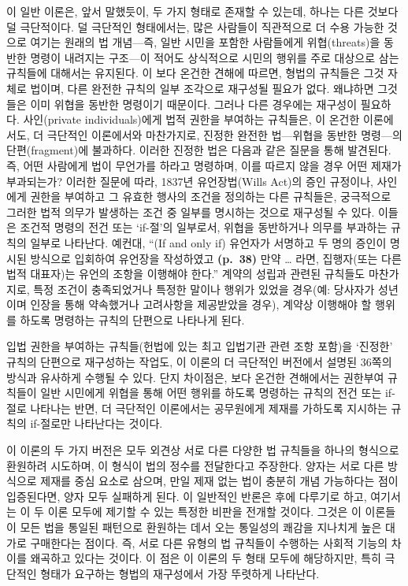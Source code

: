 \documentclass[12pt, oneside]{book}  %
\begin{document}
이 일반 이론은, 앞서 말했듯이, 두 가지 형태로 존재할 수 있는데, 하나는
다른 것보다 덜 극단적이다. 덜 극단적인 형태에서는, 많은 사람들이
직관적으로 더 수용 가능한 것으로 여기는 원래의 법 개념---즉, 일반 시민을
포함한 사람들에게 위협(threats)을 동반한 명령이 내려지는 구조---이
적어도 상식적으로 시민의 행위를 주로 대상으로 삼는 규칙들에 대해서는
유지된다. 이 보다 온건한 견해에 따르면, 형법의 규칙들은 그것 자체로
법이며, 다른 완전한 규칙의 일부 조각으로 재구성될 필요가 없다. 왜냐하면
그것들은 이미 위협을 동반한 명령이기 때문이다. 그러나 다른 경우에는
재구성이 필요하다. 사인(private individuals)에게 법적 권한을 부여하는
규칙들은, 이 온건한 이론에서도, 더 극단적인 이론에서와 마찬가지로,
진정한 완전한 법---위협을 동반한 명령---의 단편(fragment)에 불과하다.
이러한 진정한 법은 다음과 같은 질문을 통해 발견된다. 즉, 어떤 사람에게
법이 무언가를 하라고 명령하며, 이를 따르지 않을 경우 어떤 제재가
부과되는가? 이러한 질문에 따라, 1837년 유언장법(Wills Act)의 증인
규정이나, 사인에게 권한을 부여하고 그 유효한 행사의 조건을 정의하는 다른
규칙들은, 궁극적으로 그러한 법적 의무가 발생하는 조건 중 일부를 명시하는
것으로 재구성될 수 있다. 이들은 조건적 명령의 전건 또는 `if-절'의
일부로서, 위협을 동반하거나 의무를 부과하는 규칙의 일부로 나타난다.
예컨대, ``(If and only if) 유언자가 서명하고 두 명의 증인이 명시된
방식으로 입회하여 유언장을 작성하였고 \textbf{(p.~38)} 만약 \ldots{}
라면, 집행자(또는 다른 법적 대표자)는 유언의 조항을 이행해야 한다.''
계약의 성립과 관련된 규칙들도 마찬가지로, 특정 조건이 충족되었거나
특정한 말이나 행위가 있었을 경우(예: 당사자가 성년이며 인장을 통해
약속했거나 고려사항을 제공받았을 경우), 계약상 이행해야 할 행위를 하도록
명령하는 규칙의 단편으로 나타나게 된다.

입법 권한을 부여하는 규칙들(헌법에 있는 최고 입법기관 관련 조항 포함)을
`진정한' 규칙의 단편으로 재구성하는 작업도, 이 이론의 더 극단적인
버전에서 설명된 36쪽의 방식과 유사하게 수행될 수 있다. 단지 차이점은,
보다 온건한 견해에서는 권한부여 규칙들이 일반 시민에게 위협을 통해 어떤
행위를 하도록 명령하는 규칙의 전건 또는 if-절로 나타나는 반면, 더
극단적인 이론에서는 공무원에게 제재를 가하도록 지시하는 규칙의 if-절로만
나타난다는 것이다.

이 이론의 두 가지 버전은 모두 외견상 서로 다른 다양한 법 규칙들을 하나의
형식으로 환원하려 시도하며, 이 형식이 법의 정수를 전달한다고 주장한다.
양자는 서로 다른 방식으로 제재를 중심 요소로 삼으며, 만일 제재 없는 법이
충분히 개념 가능하다는 점이 입증된다면, 양자 모두 실패하게 된다. 이
일반적인 반론은 후에 다루기로 하고, 여기서는 이 두 이론 모두에 제기할 수
있는 특정한 비판을 전개할 것이다. 그것은 이 이론들이 모든 법을 통일된
패턴으로 환원하는 데서 오는 통일성의 쾌감을 지나치게 높은 대가로
구매한다는 점이다. 즉, 서로 다른 유형의 법 규칙들이 수행하는 사회적
기능의 차이를 왜곡하고 있다는 것이다. 이 점은 이 이론의 두 형태 모두에
해당하지만, 특히 극단적인 형태가 요구하는 형법의 재구성에서 가장
뚜렷하게 나타난다.
\end{document}
